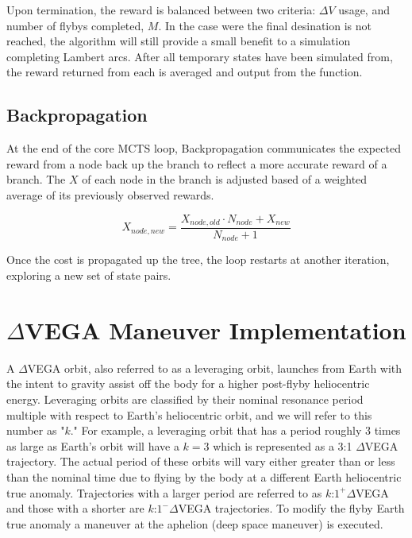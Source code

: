 \documentclass[letterpaper, preprint, paper,11pt]{AAS}	%
\begin{document}
Upon termination, the reward is balanced between two criteria: $\Delta V$ usage, and number of flybys completed, $M$. In the case were the final desination is not reached, the algorithm will still provide a small benefit to a simulation completing Lambert arcs. After all temporary states have been simulated from, the reward returned from each is averaged and output from the function.

\subsection{Backpropagation}

At the end of the core MCTS loop, Backpropagation communicates the expected reward from a node back up the branch to reflect a more accurate reward of a branch. The $X$ of each node in the branch is adjusted based of a weighted average of its previously observed rewards. 

\begin{equation}
    \label{eq:bp}
    X_{node, new} = \frac{X_{node, old} \cdot N_{node} + X_{new}}{N_{node} + 1}
\end{equation}

Once the cost is propagated up the tree, the loop restarts at another iteration, exploring a new set of state pairs.

\section{$\Delta$VEGA Maneuver Implementation}

A $\Delta$VEGA orbit, also referred to as a leveraging orbit, launches from Earth with the intent to gravity assist off the body for a higher post-flyby heliocentric energy.  Leveraging orbits are classified by their nominal resonance period multiple with respect to Earth's heliocentric orbit, and we will refer to this number as "$k$." For example, a leveraging orbit that has a period roughly 3 times as large as Earth's orbit will have a $k=3$ which is represented as a 3:1 $\Delta$VEGA trajectory. The actual period of these orbits will vary either greater than or less than the nominal time due to flying by the body at a different Earth heliocentric true anomaly. Trajectories with a larger period are referred to as $k$:$1^{+} \Delta$VEGA and those with a shorter are $k$:$1^{-} \Delta$VEGA trajectories. To modify the flyby Earth true anomaly a maneuver at the aphelion (deep space maneuver) is executed.
\end{document}
